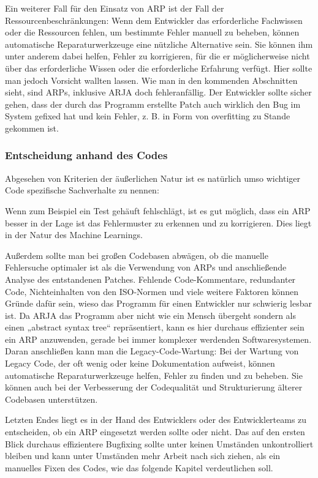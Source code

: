 \documentclass[11pt,a4paper]{article}
\begin{document}
Ein weiterer Fall für den Einsatz von ARP ist der Fall der Ressourcenbeschränkungen: Wenn dem Entwickler das erforderliche Fachwissen oder die Ressourcen fehlen, um bestimmte Fehler manuell zu beheben, können automatische Reparaturwerkzeuge eine nützliche Alternative sein. Sie können ihm unter anderem dabei helfen, Fehler zu korrigieren, für die er möglicherweise nicht über das erforderliche Wissen oder die erforderliche Erfahrung verfügt. Hier sollte man jedoch Vorsicht wallten lassen. Wie man in den kommenden Abschnitten sieht, sind ARPs, inklusive ARJA doch fehleranfällig. Der Entwickler sollte sicher gehen, dass der durch das Programm erstellte Patch auch wirklich den Bug im System gefixed hat und kein Fehler, z. B. in Form von overfitting zu Stande gekommen ist.

\subsubsection{Entscheidung anhand des Codes}

Abgesehen von Kriterien der äußerlichen Natur ist es natürlich umso wichtiger Code spezifische Sachverhalte zu nennen:

Wenn zum Beispiel ein Test gehäuft fehlschlägt, ist es gut möglich, dass ein ARP besser in der Lage ist das Fehlermuster zu erkennen und zu korrigieren. Dies liegt in der Natur des Machine Learnings.

Außerdem sollte man bei großen Codebasen abwägen, ob die manuelle Fehlersuche optimaler ist als die Verwendung von ARPs und anschließende Analyse des entstandenen Patches. Fehlende Code-Kommentare, redundanter Code, Nichteinhalten von den ISO-Normen und viele weitere Faktoren können Gründe dafür sein, wieso das Programm für einen Entwickler nur schwierig lesbar ist. Da ARJA das Programm aber nicht wie ein Mensch übergeht sondern als einen „abstract syntax tree“ repräsentiert, kann es hier durchaus effizienter sein ein ARP anzuwenden, gerade bei immer komplexer werdenden Softwaresystemen. Daran anschließen kann man die Legacy-Code-Wartung:
Bei der Wartung von Legacy Code, der oft wenig oder keine Dokumentation aufweist, können automatische Reparaturwerkzeuge helfen, Fehler zu finden und zu beheben. Sie können auch bei der Verbesserung der Codequalität und Strukturierung älterer Codebasen unterstützen.

Letzten Endes liegt es in der Hand des Entwicklers oder des Entwicklerteams zu entscheiden, ob ein ARP eingesetzt werden sollte oder nicht. Das auf den ersten Blick durchaus effizientere Bugfixing sollte unter keinen Umständen unkontrolliert bleiben und kann unter Umständen mehr Arbeit nach sich ziehen, als ein manuelles Fixen des Codes, wie das folgende Kapitel verdeutlichen soll.
\end{document}
